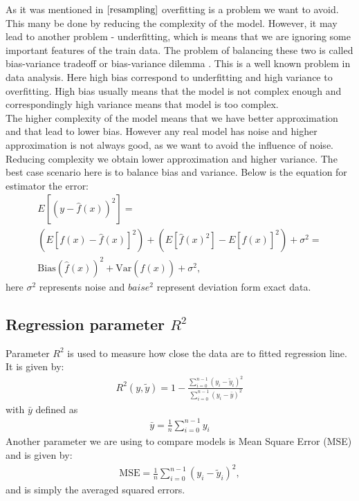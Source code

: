 \documentclass[10pt]{article}
\begin{document}
As it was mentioned in $\ref{resampling}$ overfitting is a problem we want to avoid. This many be done by reducing the complexity of the model. However, it may lead to another problem - underfitting, which is means that we are ignoring some important features of the train data. The problem of balancing these two is called bias-variance tradeoff or bias-variance dilemma \cite{biasvar}. This is a well known problem in data analysis. Here high bias correspond to underfitting and high variance to overfitting. High bias usually means that the model is not complex enough and correspondingly high variance means that model is too complex. \\
The higher complexity of the model means that we have better approximation and that lead to lower bias. However any real model has noise and higher approximation is not always good, as we want to avoid the influence of noise. Reducing complexity we obtain lower approximation and higher variance. The best case scenario here is to balance bias and variance.  
Below is the equation for estimator the error:
\begin{eqnarray}
	E[(y - \hat f(x))^2] = \nonumber \\
	 \left(E[f(x) - \hat f(x)]^2\right)+ \left(E[\hat f(x)^2] - E[\hat f(x)]^2\right) + \sigma^2 =\\ \text{Bias}(\hat f(x))^2 + \text{Var}(\hat f(x)) + \sigma^2 \nonumber,
	 \label{eq:BiasVar}
\end{eqnarray}
here $\sigma^2$ represents noise and $baise^2$ represent deviation form exact data.
\subsection{Regression parameter $R^2$}
Parameter $R^2$ is used to measure how close the data are to fitted regression line. It is given by:
\begin{align}
R^2(y,\tilde{y}) = 1 - \frac{\sum_{i=0}^{n-1}(y_i - \tilde{y}_i)^2}{\sum_{i=0}^{n-1}(y_i - \bar{y})^2}
\label{eq:r2_score}
\end{align}
with $\bar{y}$ defined as 
\begin{align*}
\bar{y} = \frac{1}{n}\sum^{n-1}_{i=0} y_i
\end{align*}
Another parameter we are using to compare models is Mean Square Error (MSE) and is given by:
\begin{align}
\text{MSE} = \frac{1}{n} \sum^{n-1}_{i=0}(y_i - \tilde{y}_i)^2,
\label{eq:mse}
\end{align}
and is simply the averaged squared errors.
\end{document}
